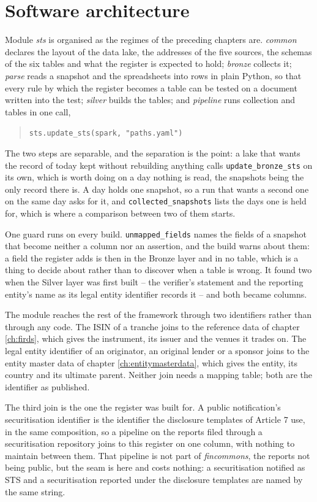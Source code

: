 \section{Software architecture}

Module \emph{sts} is organised as the regimes of the preceding chapters are. \emph{common} declares the layout of the data lake, the addresses of the five sources, the schemas of the six tables and what the register is expected to hold; \emph{bronze} collects it; \emph{parse} reads a snapshot and the spreadsheets into rows in plain Python, so that every rule by which the register becomes a table can be tested on a document written into the test; \emph{silver} builds the tables; and \emph{pipeline} runs collection and tables in one call,
\begin{quote}
\verb|sts.update_sts(spark, "paths.yaml")|
\end{quote}
The two steps are separable, and the separation is the point: a lake that wants the record of today kept without rebuilding anything calls \verb|update_bronze_sts| on its own, which is worth doing on a day nothing is read, the snapshots being the only record there is. A day holds one snapshot, so a run that wants a second one on the same day asks for it, and \verb|collected_snapshots| lists the days one is held for, which is where a comparison between two of them starts.

One guard runs on every build. \verb|unmapped_fields| names the fields of a snapshot that become neither a column nor an assertion, and the build warns about them: a field the register adds is then in the Bronze layer and in no table, which is a thing to decide about rather than to discover when a table is wrong. It found two when the Silver layer was first built -- the verifier's statement and the reporting entity's name as its legal entity identifier records it -- and both became columns.

The module reaches the rest of the framework through two identifiers rather than through any code. The ISIN of a tranche joins to the reference data of chapter \ref{ch:firds}, which gives the instrument, its issuer and the venues it trades on. The legal entity identifier of an originator, an original lender or a sponsor joins to the entity master data of chapter \ref{ch:entitymasterdata}, which gives the entity, its country and its ultimate parent. Neither join needs a mapping table; both are the identifier as published.

The third join is the one the register was built for. A public notification's securitisation identifier is the identifier the disclosure templates of Article 7 use, in the same composition, so a pipeline on the reports filed through a securitisation repository joins to this register on one column, with nothing to maintain between them. That pipeline is not part of \emph{fincommons}, the reports not being public, but the seam is here and costs nothing: a securitisation notified as STS and a securitisation reported under the disclosure templates are named by the same string.
